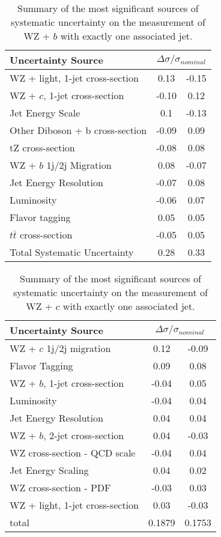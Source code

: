 \begin{table}[H]
      \centering  
      \begin{tabular}{l|cc}
        \hline\hline
        Uncertainty Source & \multicolumn{2}{c}{$\Delta \sigma/\sigma_{nominal}$ }  \\
        \hline
        WZ + light, 1-jet cross-section & 0.13 & -0.15 \\
        WZ + $c$, 1-jet cross-section & -0.10 & 0.12 \\
        Jet Energy Scale & 0.1 & -0.13 \\
        Other Diboson + b cross-section & -0.09 & 0.09 \\
        tZ cross-section & -0.08 & 0.08 \\
        WZ + $b$ 1j/2j Migration & 0.08 & -0.07 \\
        Jet Energy Resolution & -0.07 & 0.08 \\
        Luminosity & -0.06 & 0.07 \\
        Flavor tagging & 0.05 & 0.05 \\
        $t\bar{t}$ cross-section & -0.05 & 0.05 \\
        \hline
        Total Systematic Uncertainty & 0.28 & 0.33 \\
        \hline\hline
      \end{tabular}
    \caption{Summary of the most significant sources of systematic uncertainty on the measurement of WZ + $b$ with exactly one associated jet.}
    \label{tab:systematics_b1j}
\end{table}


\begin{table}[H]
  \centering
      \begin{tabular}{l|cc}
        \hline\hline
        Uncertainty Source & \multicolumn{2}{c}{$\Delta \sigma/\sigma_{nominal}$ }  \\
        \hline
        WZ + $c$ 1j/2j migration & 0.12 & -0.09 \\
        Flavor Tagging & 0.09 & 0.08 \\
        WZ + $b$, 1-jet cross-section & -0.04 & 0.05 \\
        Luminosity & -0.04 & 0.04 \\
        Jet Energy Resolution & 0.04 & 0.04 \\
        WZ + $b$, 2-jet cross-section & 0.04 & -0.03 \\
        WZ cross-section - QCD scale & -0.04 & 0.04 \\
        Jet Energy Scaling & 0.04 & 0.02 \\
        WZ cross-section - PDF & -0.03 & 0.03 \\
        WZ + light, 1-jet cross-section & 0.03 & -0.03 \\
        \hline
        total & 0.1879 & 0.1753 \\
        \hline\hline
    \end{tabular}
    \caption{Summary of the most significant sources of systematic uncertainty on the measurement of WZ + $c$ with exactly one associated jet.}
    \label{tab:systematics_c1j}
\end{table}

